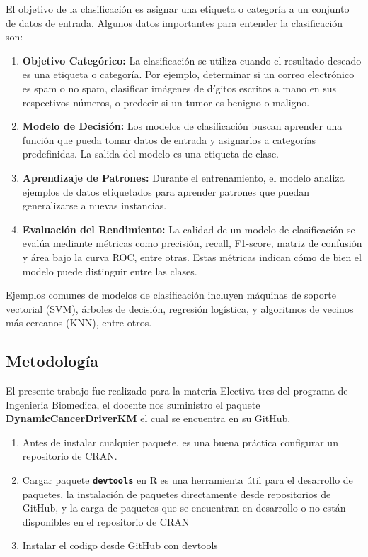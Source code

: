 \documentclass[
]{article}
\providecommand{\tightlist}{%
  \setlength{\itemsep}{0pt}\setlength{\parskip}{0pt}}
\begin{document}
El objetivo de la clasificación es asignar una etiqueta o categoría a un
conjunto de datos de entrada. Algunos datos importantes para entender la
clasificación son:

\begin{enumerate}
\def\labelenumi{\arabic{enumi}.}
\item
  \textbf{Objetivo Categórico:} La clasificación se utiliza cuando el
  resultado deseado es una etiqueta o categoría. Por ejemplo, determinar
  si un correo electrónico es spam o no spam, clasificar imágenes de
  dígitos escritos a mano en sus respectivos números, o predecir si un
  tumor es benigno o maligno.
\item
  \textbf{Modelo de Decisión:} Los modelos de clasificación buscan
  aprender una función que pueda tomar datos de entrada y asignarlos a
  categorías predefinidas. La salida del modelo es una etiqueta de
  clase.
\item
  \textbf{Aprendizaje de Patrones:} Durante el entrenamiento, el modelo
  analiza ejemplos de datos etiquetados para aprender patrones que
  puedan generalizarse a nuevas instancias.
\item
  \textbf{Evaluación del Rendimiento:} La calidad de un modelo de
  clasificación se evalúa mediante métricas como precisión, recall,
  F1-score, matriz de confusión y área bajo la curva ROC, entre otras.
  Estas métricas indican cómo de bien el modelo puede distinguir entre
  las clases.
\end{enumerate}

Ejemplos comunes de modelos de clasificación incluyen máquinas de
soporte vectorial (SVM), árboles de decisión, regresión logística, y
algoritmos de vecinos más cercanos (KNN), entre otros.

\hypertarget{metodologuxeda-1}{%
\subsection{Metodología}\label{metodologuxeda-1}}

El presente trabajo fue realizado para la materia Electiva tres del
programa de Ingenieria Biomedica, el docente nos suministro el paquete
\textbf{DynamicCancerDriverKM} el cual se encuentra en su GitHub.

\begin{enumerate}
\def\labelenumi{\arabic{enumi}.}
\tightlist
\item
  Antes de instalar cualquier paquete, es una buena práctica configurar
  un repositorio de CRAN.
\item
  Cargar paquete \textbf{\texttt{devtools}} en R es una herramienta útil
  para el desarrollo de paquetes, la instalación de paquetes
  directamente desde repositorios de GitHub, y la carga de paquetes que
  se encuentran en desarrollo o no están disponibles en el repositorio
  de CRAN
\item
  Instalar el codigo desde GitHub con devtools
\end{enumerate}
\end{document}
